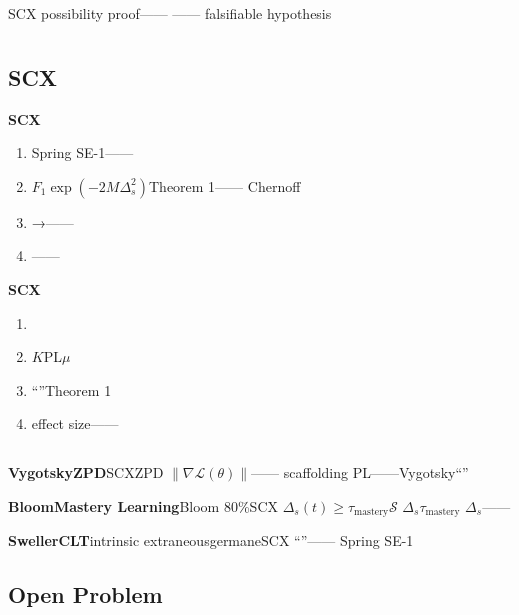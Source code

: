 \documentclass[11pt,a4paper]{article}
\theoremstyle{remark}
\newcommand{\Sstates}{\mathcal{S}}
\begin{document}
\textbf{}SCX\textbf{}
possibility proof——
\textbf{}——
\textbf{}falsifiable hypothesis


\section{}

\subsection{SCX}

\textbf{SCX}

\begin{enumerate}[label=(\arabic*)]
    \item Spring SE-1——
          
    \item $F_1$$\exp(-2M\Delta_s^2)$Theorem 1——
          Chernoff
    \item →——
          
    \item ——
          
\end{enumerate}

\textbf{SCX}

\begin{enumerate}[label=(\arabic*)]
    \item 
    \item $K$PL$\mu$
    \item ``''Theorem 1
    \item effect size——
          
\end{enumerate}

\subsection{}

\textbf{VygotskyZPD}SCXZPD
$\|\nabla\mathcal{L}(\theta)\|$——
\textbf{}scaffolding
PL——Vygotsky``''


\textbf{BloomMastery Learning}Bloom
80\%SCX
$\Delta_s(t) \geq \tau_{\text{mastery}}$$\Sstates$
$\Delta_s$$\tau_{\text{mastery}}$
$\Delta_s$——

\textbf{SwellerCLT}intrinsic
extraneousgermaneSCX
``''——
Spring SE-1

\subsection{Open Problem}
\end{document}
